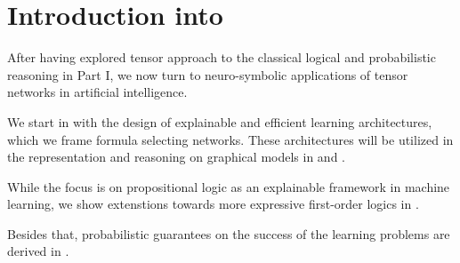 \chapter{Introduction into }

After having explored tensor approach to the classical logical and probabilistic reasoning in Part I, we now turn to neuro-symbolic applications of tensor networks in artificial intelligence.

We start in  with the design of explainable and efficient learning architectures, which we frame formula selecting networks.
These architectures will be utilized in the representation and reasoning on graphical models in  and .

While the focus is on propositional logic as an explainable framework in machine learning, we show extenstions towards more expressive first-order logics in .

Besides that, probabilistic guarantees on the success of the learning problems are derived in .